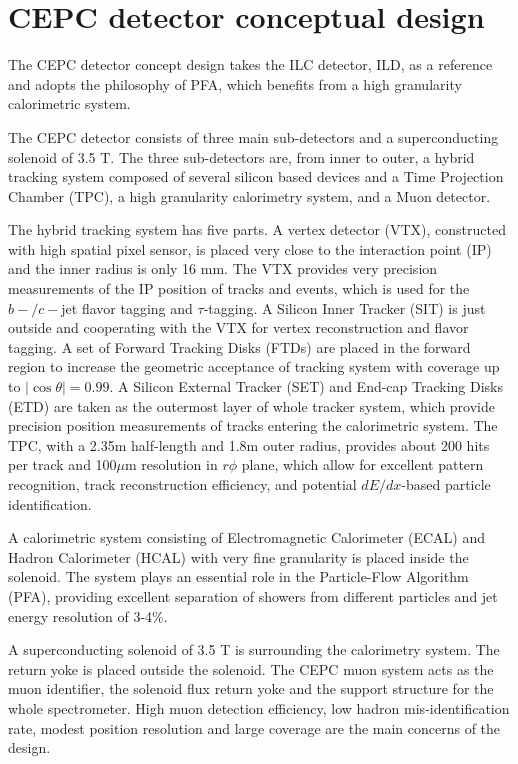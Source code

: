 \documentclass[a4paper,10pt,twoside]{cpc-hepnp}
\begin{document}
\section{CEPC detector conceptual design\label{sec:detector}}

The CEPC detector concept design\cite{ref:cepc_det}  takes the ILC detector, ILD\cite{ref:ilc, ref:ild},  as a reference and adopts the philosophy of PFA, which benefits from a high granularity  calorimetric system.

The CEPC detector consists of three main sub-detectors and a superconducting solenoid of 3.5 T.  The three sub-detectors are, from inner to outer,  a hybrid tracking system composed of several silicon based devices and a Time Projection Chamber (TPC), a high granularity calorimetry system, and a Muon detector.

The hybrid tracking system has five parts.  A vertex detector (VTX), constructed with high spatial pixel sensor, is placed very close to the interaction point (IP) and  the inner radius is only 16 mm. The VTX provides very precision measurements of the IP position of tracks and events, which is used for the $b-/c-$jet flavor tagging and $\tau$-tagging.  A Silicon Inner Tracker (SIT) is just outside  and cooperating with the VTX for vertex reconstruction and flavor tagging. A set of Forward Tracking Disks (FTDs)  are placed in the forward region to increase the geometric acceptance of tracking system with coverage up to $|\cos\theta| = 0.99$.  A Silicon External Tracker (SET) and End-cap Tracking Disks (ETD) are taken as the outermost layer of whole tracker system, which provide precision position measurements of tracks entering the calorimetric system.  The TPC, with a 2.35m half-length and 1.8m outer radius, provides about 200 hits per track and 100$\mu$m resolution in $r\phi$ plane, which allow for excellent pattern recognition,  track reconstruction efficiency, and potential $dE/dx$-based particle identification.

A calorimetric system consisting of Electromagnetic Calorimeter (ECAL) and Hadron Calorimeter (HCAL) with very fine granularity is placed inside the solenoid. The system plays an essential role in the Particle-Flow Algorithm (PFA), providing excellent separation of showers from different particles and jet energy resolution of 3-4\%.

A superconducting solenoid of 3.5 T is surrounding the calorimetry system. The return yoke is placed outside the solenoid. The CEPC muon system acts as the muon identifier, the solenoid flux return yoke and the support structure for the whole spectrometer. High muon detection efficiency, low hadron mis-identification rate, modest position resolution and large coverage are the main concerns of the design.
\end{document}
